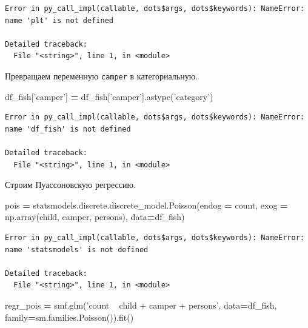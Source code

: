 \documentclass[]{book}
\newenvironment{Shaded}{\begin{snugshade}}{\end{snugshade}}
\newcommand{\NormalTok}[1]{#1}
\newcommand{\OperatorTok}[1]{\textcolor[rgb]{0.81,0.36,0.00}{\textbf{#1}}}
\newcommand{\StringTok}[1]{\textcolor[rgb]{0.31,0.60,0.02}{#1}}
\begin{document}
\begin{verbatim}
Error in py_call_impl(callable, dots$args, dots$keywords): NameError: name 'plt' is not defined

Detailed traceback: 
  File "<string>", line 1, in <module>
\end{verbatim}

Превращаем переменную \texttt{camper} в категориальную.

\begin{Shaded}
\begin{Highlighting}[]
\NormalTok{df_fish[}\StringTok{'camper'}\NormalTok{] }\OperatorTok{=}\NormalTok{ df_fish[}\StringTok{'camper'}\NormalTok{].astype(}\StringTok{'category'}\NormalTok{)}
\end{Highlighting}
\end{Shaded}

\begin{verbatim}
Error in py_call_impl(callable, dots$args, dots$keywords): NameError: name 'df_fish' is not defined

Detailed traceback: 
  File "<string>", line 1, in <module>
\end{verbatim}

Строим Пуассоновскую регрессию.

\begin{Shaded}
\begin{Highlighting}[]
\NormalTok{pois }\OperatorTok{=}\NormalTok{ statsmodels.discrete.discrete_model.Poisson(endog }\OperatorTok{=}\NormalTok{ count, exog }\OperatorTok{=}\NormalTok{ np.array(child, camper, persons), data}\OperatorTok{=}\NormalTok{df_fish)}
\end{Highlighting}
\end{Shaded}

\begin{verbatim}
Error in py_call_impl(callable, dots$args, dots$keywords): NameError: name 'statsmodels' is not defined

Detailed traceback: 
  File "<string>", line 1, in <module>
\end{verbatim}

\begin{Shaded}
\begin{Highlighting}[]
\NormalTok{regr_pois }\OperatorTok{=}\NormalTok{ smf.glm(}\StringTok{'count ~ child + camper +  persons'}\NormalTok{, data}\OperatorTok{=}\NormalTok{df_fish,}
\NormalTok{                    family}\OperatorTok{=}\NormalTok{sm.families.Poisson()).fit()}
\end{Highlighting}
\end{Shaded}
\end{document}

